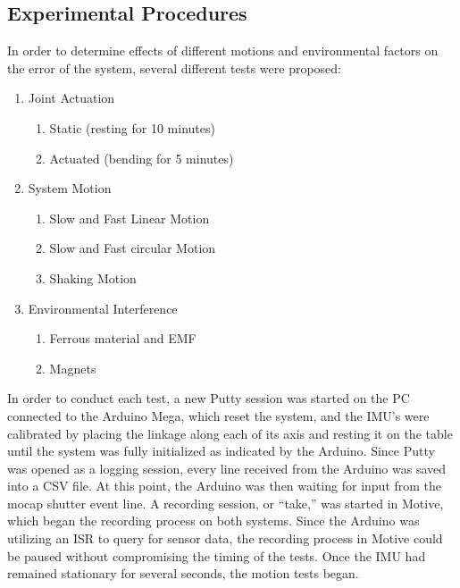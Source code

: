 \documentclass[letterpaper, 10 pt, conference]{ieeeconf}  %
\begin{document}
\subsection{Experimental Procedures}\label{subsection:experimentalProcedures}
In order to determine effects of different motions and environmental factors on the error of the system, several different tests were proposed:
\begin{enumerate}
\item Joint Actuation
  \begin{enumerate}
  \item Static (resting for 10 minutes)
  \item Actuated (bending for 5 minutes)
  \end{enumerate}
\item System Motion
  \begin{enumerate}
  \item Slow and Fast Linear Motion
  \item Slow and Fast circular Motion
  \item Shaking Motion
  \end{enumerate}
\item Environmental Interference
  \begin{enumerate}
  \item Ferrous material and EMF
  \item Magnets
  \end{enumerate}
\end{enumerate}

In order to conduct each test, a new Putty session was started on the PC connected to the Arduino Mega, which reset the system, and the IMU's were calibrated by placing the linkage along each of its axis and resting it on the table until the system was fully initialized as indicated by the Arduino. Since Putty was opened as a logging session, every line received from the Arduino was saved into a CSV file. At this point, the Arduino was then waiting for input from the mocap shutter event line. A recording session, or ``take,'' was started in Motive, which began the recording process on both systems. Since the Arduino was utilizing an ISR to query for sensor data, the recording process in Motive could be paused without compromising the timing of the tests. Once the IMU had remained stationary for several seconds, the motion tests began. 
\end{document}
